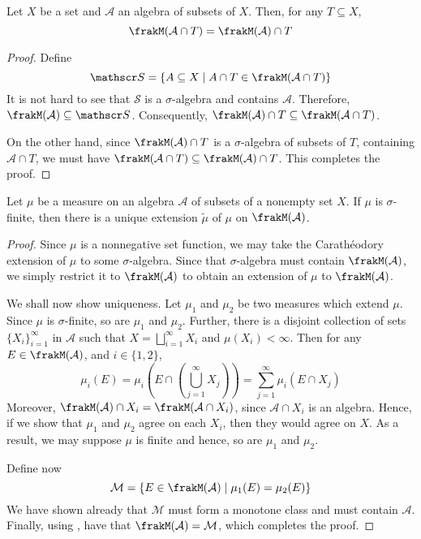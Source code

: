 \begin{lemma}
    Let $X$ be a set and $\mathcal A$ an algebra of subsets of $X$. Then, for any $T\subseteq X$, 
    \begin{equation*}
        \frakM(\mathcal A\cap T) = \frakM(\mathcal A)\cap T
    \end{equation*}
\end{lemma}
\begin{proof}
    Define 
    \begin{equation*}
        \mathscr S = \{A\subseteq X\mid A\cap T\in\frakM(\mathcal A\cap T)\}
    \end{equation*}
    It is not hard to see that $\mathscr S$ is a $\sigma$-algebra and contains $\mathcal A$. Therefore, $\frakM(\mathcal A)\subseteq\mathscr S$. Consequently, $\frakM(\mathcal A)\cap T\subseteq\frakM(\mathcal A\cap T)$.

    On the other hand, since $\frakM(\mathcal A)\cap T$ is a $\sigma$-algebra of subsets of $T$, containing $\mathcal A\cap T$, we must have $\frakM(\mathcal A\cap T)\subseteq\frakM(\mathcal A)\cap T$. This completes the proof.
\end{proof}

\begin{theorem}
    Let $\mu$ be a measure on an algebra $\mathcal A$ of subsets of a nonempty set $X$. If $\mu$ is $\sigma$-finite, then there is a unique extension $\widetilde\mu$ of $\mu$ on $\frakM(\mathcal A)$.
\end{theorem}
\begin{proof}
    Since $\mu$ is a nonnegative set function, we may take the Carath\'eodory extension of $\mu$ to some $\sigma$-algebra. Since that $\sigma$-algebra must contain $\frakM(\mathcal A)$, we simply restrict it to $\frakM(\mathcal A)$ to obtain an extension of $\mu$ to $\frakM(\mathcal A)$.

    We shall now show uniqueness. Let $\mu_1$ and $\mu_2$ be two measures which extend $\mu$. Since $\mu$ is $\sigma$-finite, so are $\mu_1$ and $\mu_2$. Further, there is a disjoint collection of sets $\{X_i\}_{i = 1}^\infty$ in $\mathcal A$ such that $X = \bigsqcup_{i = 1}^\infty X_i$ and $\mu(X_i) < \infty$. Then for any $E\in\frakM(\mathcal A)$, and $i\in\{1,2\}$,
    \begin{equation*}
        \mu_i(E) = \mu_i\left(E\cap\left(\bigcup_{j = 1}^\infty X_j\right)\right) = \sum_{j = 1}^\infty\mu_i(E\cap X_j)
    \end{equation*}
    Moreover, $\frakM(\mathcal A)\cap X_i = \frakM(\mathcal A\cap X_i)$, since $\mathcal A\cap X_i$ is an algebra. Hence, if we show that $\mu_1$ and $\mu_2$ agree on each $X_i$, then they would agree on $X$. As a result, we may suppose $\mu$ is finite and hence, so are $\mu_1$ and $\mu_2$.

    Define now 
    \begin{equation*}
        \mathcal M = \{E\in\frakM(\mathcal A)\mid\mu_1(E) = \mu_2(E)\}
    \end{equation*}
    We have shown already that $\mathcal M$ must form a monotone class and must contain $\mathcal A$. Finally, using , have that $\frakM(\mathcal A) = \mathcal M$, which completes the proof.
\end{proof}